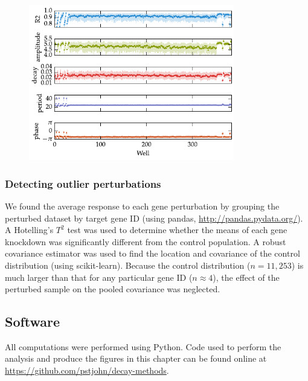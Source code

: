 \begin{figure}[tbp]
  \begin{center}
    \includegraphics[width=0.8\textwidth]{chap6/figures/zhang_wells.pdf}
  \end{center}
\label{fig:well_variation}
\end{figure}


\subsubsection{Detecting outlier perturbations}
We found the average response to each gene perturbation by grouping the perturbed dataset by target gene ID (using pandas, \url{http://pandas.pydata.org/}).
A Hotelling's $T^2$ test was used to determine whether the means of each gene knockdown was significantly different from the control population.
A robust covariance estimator was used to find the location and covariance of the control distribution (using scikit-learn).
Because the control distribution ($n=11,253$) is much larger than that for any particular gene ID ($n \approx 4$), the effect of the perturbed sample on the pooled covariance was neglected.

\subsection{Software}
All computations were performed using Python.
Code used to perform the analysis and produce the figures in this chapter can be found online at \url{https://github.com/pstjohn/decay-methods}.


